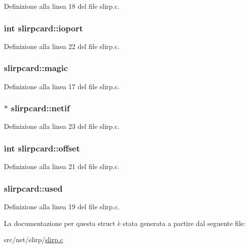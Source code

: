 Definizione alla linea 18 del file slirp.\+c.

\hypertarget{structslirpcard_aed1b09924afb61043cd93bed7edea389}{
\subsubsection[{ioport}]{\setlength{\rightskip}{0pt plus 5cm}int slirpcard\+::ioport}}\label{structslirpcard_aed1b09924afb61043cd93bed7edea389}


Definizione alla linea 22 del file slirp.\+c.

\hypertarget{structslirpcard_ab77a4a7b33ab2cd4a821aff9445cd134}{
\subsubsection[{magic}]{ slirpcard\+::magic}}\label{structslirpcard_ab77a4a7b33ab2cd4a821aff9445cd134}


Definizione alla linea 17 del file slirp.\+c.

\hypertarget{structslirpcard_a4c84f5911831326cc979fe1c96c8607b}{
\subsubsection[{netif}]{$\ast$ slirpcard\+::netif}}\label{structslirpcard_a4c84f5911831326cc979fe1c96c8607b}


Definizione alla linea 23 del file slirp.\+c.

\hypertarget{structslirpcard_adda6ed53672da7a5e56fd16007d704d0}{
\subsubsection[{offset}]{\setlength{\rightskip}{0pt plus 5cm}int slirpcard\+::offset}}\label{structslirpcard_adda6ed53672da7a5e56fd16007d704d0}


Definizione alla linea 21 del file slirp.\+c.

\hypertarget{structslirpcard_aca0b3836ef213a9ab9cab689175d6a38}{
\subsubsection[{used}]{ slirpcard\+::used}}\label{structslirpcard_aca0b3836ef213a9ab9cab689175d6a38}


Definizione alla linea 19 del file slirp.\+c.



La documentazione per questa struct è stata generata a partire dal seguente file\+:\begin{DoxyCompactItemize}
\item 
src/net/slirp/\hyperlink{slirp_8c}{slirp.\+c}\end{DoxyCompactItemize}
